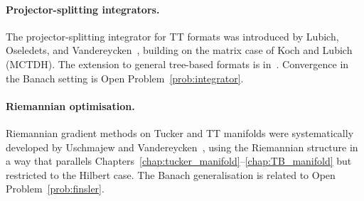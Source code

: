 \paragraph{Projector-splitting integrators.}
The projector-splitting integrator for TT formats was introduced by
Lubich, Oseledets, and Vandereycken~\cite{LubichOseledetsVandereycken2015},
building on the matrix case of Koch and Lubich~\cite{KochLubich2007}
(MCTDH). The extension to general tree-based formats is
in~\cite{CerutiLubichWalach2020}. Convergence in the Banach setting
is Open Problem~\ref{prob:integrator}.

\paragraph{Riemannian optimisation.}
Riemannian gradient methods on Tucker and TT manifolds were
systematically developed by Uschmajew and
Vandereycken~\cite{UschmajewVandereycken2020}, using the Riemannian
structure in a way that parallels
Chapters~\ref{chap:tucker_manifold}--\ref{chap:TB_manifold} but
restricted to the Hilbert case. The Banach generalisation is related
to Open Problem~\ref{prob:finsler}.
